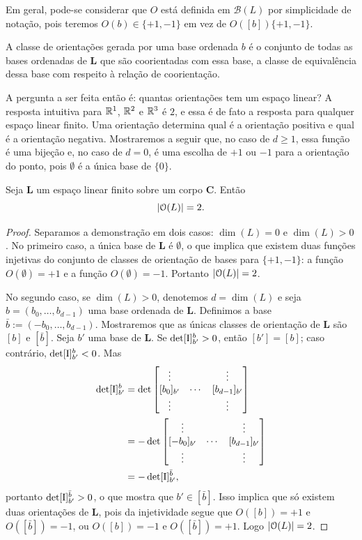 Em geral, pode-se considerar que $O$ está definida em $\mathcal{B}(L)$ por simplicidade de notação, pois teremos $O(b) \in \{+1,-1\}$ em vez de $O([b])\{+1,-1\}$.

A classe de orientações gerada por uma base ordenada $b$ é o conjunto de todas as bases ordenadas de $\bm L$ que são coorientadas com essa base, a classe de equivalência dessa base com respeito à relação de coorientação. 

A pergunta a ser feita então é: quantas orientações tem um espaço linear? A resposta intuitiva para $\mathbb{R}^1$, $\mathbb{R}^2$ e $\mathbb{R}^3$ é $2$, e essa é de fato a resposta para qualquer espaço linear finito. Uma orientação determina qual é a orientação positiva e qual é a orientação negativa. Mostraremos a seguir que, no caso de $d \geq 1$, essa função é uma bijeção e, no caso de $d=0$, é uma escolha de $+1$ ou $-1$ para a orientação do ponto, pois $\emptyset$ é a única base de $\{0\}$.

\begin{proposition}
Seja $\bm L$ um espaço linear finito sobre um corpo $\bm C$. Então
	\begin{equation*}
	\left\lvert{\mathcal{O}(L)}\right\rvert = 2.
	\end{equation*}
\end{proposition}
\begin{proof}
Separamos a demonstração em dois casos: $\dim(L)=0$ e $\dim(L)>0$. No primeiro caso, a única base de $\bm L$ é $\emptyset$, o que implica que existem duas funções injetivas do conjunto de classes de orientação de bases para $\{+1,-1\}$: a função $O(\emptyset) = +1$ e a função $O(\emptyset) = -1$. Portanto $\left\lvert{\mathcal{O}(L)}\right\rvert=2$.

No segundo caso, se $\dim(L)>0$, denotemos $d = \dim(L)$ e seja $b = (b_0,\ldots,b_{d-1})$ uma base ordenada de $\bm L$. Definimos a base $\bar b := (-b_0,\ldots,b_{d-1})$. Mostraremos que as únicas classes de orientação de $\bm L$ são $[b]$ e $[\bar b]$. Seja $b'$ uma base de $\bm L$. Se $\det [\mathrm{I}]^b_{b'} > 0$, então $[b'] = [b]$; caso contrário, $\det [\mathrm{I}]^b_{b'} < 0$. Mas
	\begin{align*}
	\det [\mathrm{I}]^b_{b'} &= \det \begin{bmatrix}
	\vdots &   & \vdots \\ 
	[b_0]_{b'} & \cdots & [b_{d-1}]_{b'} \\ 
	\vdots &   & \vdots
	\end{bmatrix} \\
	&=	- \det \begin{bmatrix}
	\vdots &   & \vdots \\ 
	[-b_0]_{b'} & \cdots & [b_{d-1}]_{b'} \\ 
	\vdots &   & \vdots
	\end{bmatrix} \\
	&= -\det [\mathrm{I}]^{\bar b}_{b'},
	\end{align*}
portanto $\det  [\mathrm{I}]^{\bar b}_{b'} > 0$, o que mostra que $b' \in [\bar b]$. Isso implica que só existem duas orientações de $\bm L$, pois da injetividade segue que $O([b])=+1$ e $O([\bar b])=-1$, ou $O([b])=-1$ e $O([\bar b])=+1$. Logo $\left\lvert{\mathcal{O}(L)}\right\rvert=2$.
\end{proof}

